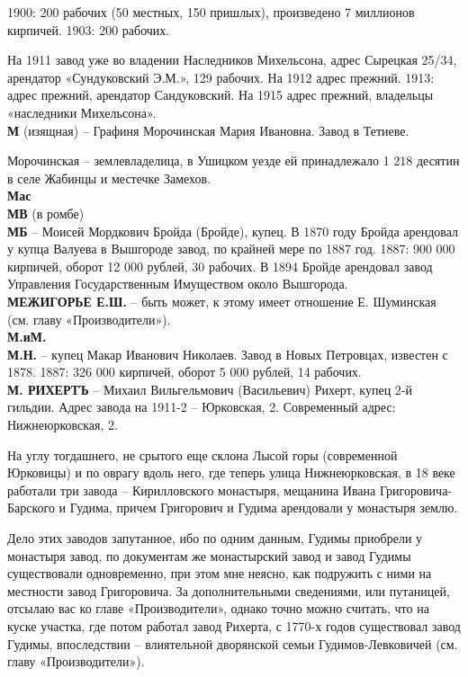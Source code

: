 1900: 200 рабочих (50 местных, 150 пришлых), произведено 7 миллионов кирпичей. 1903: 200 рабочих. 

На 1911 завод уже во владении Наследников Михельсона, адрес Сырецкая 25/34, арендатор «Сундуковский Э.М.», 129 рабочих. На 1912 адрес прежний. 1913: адрес прежний, арендатор Сандуковский. На 1915 адрес прежний, владельцы «наследники Михельсона».\\

\noindent\textbf{М} (изящная) – Графиня Морочинская Мария Ивановна. Завод в Тетиеве.

Морочинская – землевладелица, в Ушицком уезде ей принадлежало 1 218 десятин в селе Жабинцы и местечке Замехов.\\

\noindent\textbf{Мас}\\

\noindent\textbf{МВ} (в ромбе)\\

\noindent\textbf{МБ} – Моисей Мордкович Бройда (Бройде), купец. В 1870 году Бройда арендовал у купца Валуева в Вышгороде завод, по крайней мере по 1887 год. 1887: 900 000 кирпичей, оборот 12 000 рублей, 30 рабочих. В 1894 Бройде арендовал завод Управления Государственным Имуществом около Вышгорода.\\ 

\noindent\textbf{МЕЖИГОРЬЕ Е.Ш.} – быть может, к этому имеет отношение Е. Шуминская (см. главу «Производители»).\\

\noindent\textbf{М.иМ.}\\

\noindent\textbf{М.Н.} – купец Макар Иванович Николаев. Завод в Новых Петровцах, известен с 1878. 1887: 326 000 кирпичей, оборот 5 000 рублей, 14 рабочих.\\

\noindent\textbf{М. РИХЕРТЪ} – Михаил Вильгельмович (Васильевич) Рихерт, купец 2-й гильдии. Адрес завода на 1911-2 – Юрковская, 2.
Современный адрес: Нижнеюрковская, 2.

На углу тогдашнего, не срытого еще склона Лысой горы (современной Юрковицы) и по оврагу вдоль него, где теперь улица Нижнеюрковская, в 18 веке работали три завода – Кирилловского монастыря, мещанина Ивана Григоровича-Барского и Гудима, причем Григорович и Гудима арендовали у монастыря землю. 

Дело этих заводов запутанное, ибо по одним данным, Гудимы приобрели у монастыря завод, по документам же монастырский завод и завод Гудимы существовали одновременно, при этом мне неясно, как подружить с ними на местности завод Григоровича. За дополнительными сведениями, или путаницей, отсылаю вас ко главе «Производители», однако точно можно считать, что на куске участка, где потом работал завод Рихерта, с 1770-х годов существовал завод Гудимы, впоследствии – влиятельной дворянской семьи Гудимов-Левковичей (см. главу «Производители»). 

